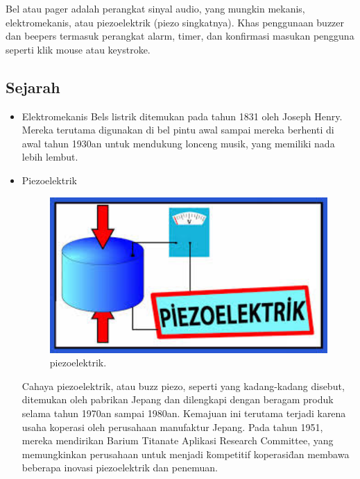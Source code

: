 Bel atau pager adalah perangkat sinyal audio, yang mungkin mekanis, elektromekanis, atau piezoelektrik (piezo singkatnya). Khas penggunaan buzzer dan beepers termasuk 
perangkat alarm, timer, dan konfirmasi masukan pengguna seperti klik mouse atau keystroke.

\subsection{Sejarah}
\begin{itemize}
\item Elektromekanis
Bels listrik ditemukan pada tahun 1831 oleh Joseph Henry. Mereka terutama digunakan di bel pintu awal sampai mereka berhenti di awal tahun 1930an untuk mendukung
lonceng musik, yang memiliki nada lebih lembut.
\item Piezoelektrik

\begin{figure}[ht]
	\centerline{\includegraphics[width=1\textwidth]{figures/piezoelektrik.JPG}}
	\caption{piezoelektrik.}
	\label{piezoelektrik}
\end{figure}
	
Cahaya piezoelektrik, atau buzz piezo, seperti yang kadang-kadang disebut, ditemukan oleh pabrikan Jepang dan dilengkapi dengan beragam produk selama tahun 1970an 
sampai 1980an. Kemajuan ini terutama terjadi karena usaha koperasi oleh perusahaan manufaktur Jepang. Pada tahun 1951, mereka mendirikan Barium Titanate Aplikasi 
Research Committee, yang memungkinkan perusahaan untuk menjadi \"kompetitif koperasi\" dan membawa beberapa inovasi piezoelektrik dan penemuan.
\end{itemize}

